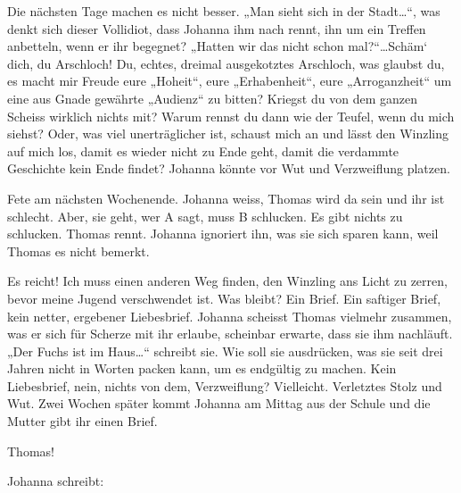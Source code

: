 \documentclass[10pt,titlepage,a5paper]{book}
\begin{document}
Die nächsten Tage machen es nicht besser. „Man sieht sich in der Stadt\dots “, was denkt sich dieser Vollidiot, dass Johanna ihm nach rennt, ihn um ein Treffen anbetteln, wenn er ihr begegnet? „Hatten wir das nicht schon mal?“\dots  Schäm` dich, du Arschloch! Du, echtes, dreimal ausgekotztes Arschloch, was glaubst du, es macht mir Freude eure „Hoheit“, eure „Erhabenheit“, eure „Arroganzheit“ um eine aus Gnade gewährte „Audienz“ zu bitten? Kriegst du von dem ganzen Scheiss wirklich nichts mit? Warum rennst du dann wie der Teufel, wenn du mich siehst? Oder, was viel unerträglicher ist, schaust mich an und lässt den Winzling auf mich los, damit es wieder nicht zu Ende geht, damit die verdammte Geschichte kein Ende findet? Johanna könnte vor Wut und Verzweiflung platzen.

Fete am nächsten Wochenende. Johanna weiss, Thomas wird da sein und ihr ist schlecht. Aber, sie geht, wer A sagt, muss B schlucken. Es gibt nichts zu schlucken. Thomas rennt. Johanna ignoriert ihn, was sie sich sparen kann, weil Thomas es nicht bemerkt.

Es reicht! Ich muss einen anderen Weg finden, den Winzling ans Licht zu zerren, bevor meine Jugend verschwendet ist. Was bleibt? Ein Brief. Ein saftiger Brief, kein netter, ergebener Liebesbrief. Johanna scheisst Thomas vielmehr zusammen, was er sich für Scherze mit ihr erlaube, scheinbar erwarte, dass sie ihm nachläuft. „Der Fuchs ist im Haus\dots “ schreibt sie. Wie soll sie ausdrücken, was sie seit drei Jahren nicht in Worten packen kann, um es endgültig zu machen. Kein Liebesbrief, nein, nichts von dem, Verzweiflung? Vielleicht. Verletztes Stolz und Wut.
Zwei Wochen später kommt Johanna am Mittag aus der Schule und die Mutter gibt ihr einen Brief.

 Thomas!

Johanna schreibt:
\end{document}
